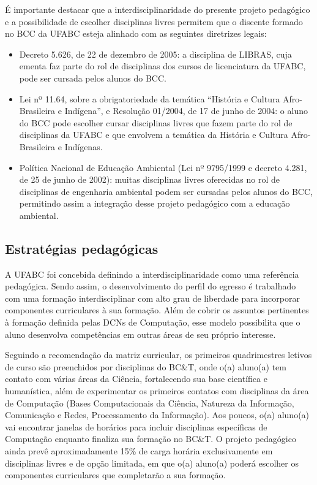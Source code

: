 É importante destacar que a interdisciplinaridade do presente projeto
pedagógico e a possibilidade de escolher disciplinas livres permitem que o
discente formado no BCC da UFABC esteja alinhado com as seguintes diretrizes
legais:
\begin{itemize}
    \item Decreto 5.626, de 22 de dezembro de 2005: a disciplina de LIBRAS,
    cuja ementa faz parte do rol de disciplinas dos cursos de licenciatura da
    UFABC, pode ser cursada pelos alunos do BCC.
    
    \item Lei nº 11.64, sobre a obrigatoriedade da temática ``História e
    Cultura Afro-Brasileira e Indígena'', e Resolução 01/2004, de 17 de junho
    de 2004: o aluno do BCC pode escolher cursar disciplinas livres que fazem
    parte do rol de disciplinas da UFABC e que envolvem a temática da História
    e Cultura Afro-Brasileira e Indígenas.
    
    \item Política Nacional de Educação Ambiental (Lei nº 9795/1999 e decreto
    4.281, de 25 de junho de 2002): muitas disciplinas livres oferecidas no rol
    de disciplinas de engenharia ambiental podem ser cursadas pelos alunos do
    BCC, permitindo assim a integração desse projeto pedagógico com a educação
    ambiental.
\end{itemize}



\subsection{Estratégias pedagógicas}

A UFABC foi concebida definindo a interdisciplinaridade como uma referência
pedagógica.
Sendo assim, o desenvolvimento do perfil do egresso é trabalhado com uma
formação interdisciplinar com alto grau de liberdade para incorporar
componentes curriculares à sua formação.
Além de cobrir os assuntos pertinentes à formação definida pelas DCNs de
Computação, esse modelo possibilita que o aluno desenvolva competências em
outras áreas de seu próprio interesse.

Seguindo a recomendação da matriz curricular, os primeiros quadrimestres
letivos de curso são preenchidos por disciplinas do BC\&T, onde o(a) aluno(a)
tem contato com várias áreas da Ciência, fortalecendo sua base científica e
humanística, além de experimentar os primeiros contatos com disciplinas da área
de Computação (Bases Computacionais da Ciência, Natureza da Informação,
Comunicação e Redes, Processamento da Informação).
Aos poucos, o(a) aluno(a) vai encontrar janelas de horários para incluir
disciplinas específicas de Computação enquanto finaliza sua formação no BC\&T.
O projeto pedagógico ainda prevê aproximadamente 15\% de carga horária exclusivamente 
em disciplinas livres e de opção limitada, em que o(a) aluno(a) poderá escolher os componentes
curriculares que completarão a sua formação.

